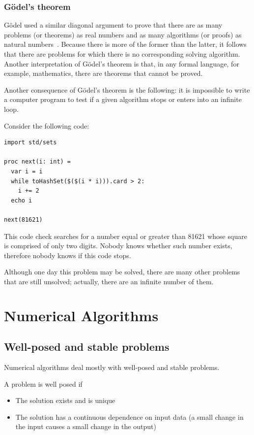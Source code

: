 \documentclass[justified, sixbynine]{tufte-book}
\theoremstyle{plain}%
\newtheorem * {corollary}{Corollary}
\theoremstyle{definition}
\theoremstyle{remark}
\newtheorem * {remark}{Remark}
\newtheorem * {note}{Note}
\begin{document}
\begin{fullwidth}
\subsection{G\"odel's theorem}


G\"odel used a similar diagonal argument to prove that there are as many
problems (or theorems) as real numbers and as many algorithms (or proofs) as
natural numbers~\cite{hofstadter}. Because there is more of the former than the latter, it
follows that there are problems for which there is no corresponding solving
algorithm. Another interpretation of G\"odel's theorem is that, in any formal
language, for example, mathematics, there are theorems that cannot be proved.

Another consequence of G\"odel's theorem is the following:
it is impossible to write a computer program to test if a given algorithm
stops or enters into an infinite loop.

Consider the following code:

\begin{lstlisting}
import std/sets

proc next(i: int) =
  var i = i
  while toHashSet($($(i * i))).card > 2:
    i += 2
  echo i

next(81621)
\end{lstlisting}

This code check searches for a number equal or greater than 81621 whose square is comprised of only two digits.
Nobody knows whether such number exists, therefore nobody knows if this code stops.

Although one day this problem may be solved, there are many other problems that
are still unsolved; actually, there are an infinite number of them.

\chapter{Numerical Algorithms}

\goodbreak\section{Well-posed and stable problems}


Numerical algorithms deal mostly with well-posed and stable problems.

A problem is well posed if
\begin{itemize}
\item The solution exists and is unique
\item The solution has a continuous dependence on input data (a small change in the input causes a small change in the output)
\end{itemize}


\end{fullwidth}
\end{document}
